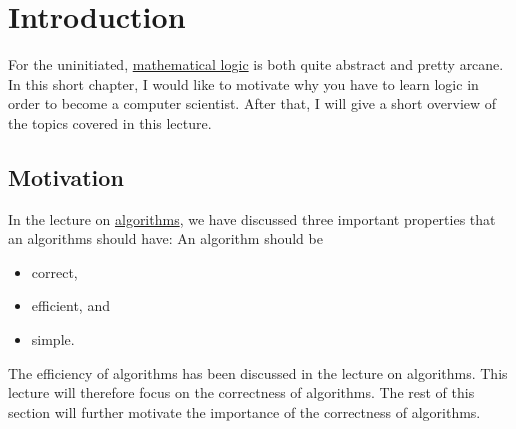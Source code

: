 \chapter{Introduction}
For the uninitiated, \href{https://en.wikipedia.org/wiki/Mathematical_logic}{mathematical logic} 
is both quite abstract and pretty arcane.  
In this short chapter, I would like to motivate why you have to learn
logic in order to become a computer scientist.  After that, I will give a short overview of the topics covered
in this lecture.

\section{Motivation}
In the lecture on \href{https://github.com/karlstroetmann/Algorithms/blob/master/Lecture-Notes/algorithms.pdf}{algorithms},
we have discussed three important properties that an algorithms should have:
An algorithm should be
\begin{itemize}
\item correct,
\item efficient, and
\item simple.  
\end{itemize}
The efficiency of algorithms has been discussed in the lecture on algorithms.  This lecture will
therefore focus on the correctness of algorithms.  The rest of this section will further motivate the
importance of the correctness of algorithms. 

